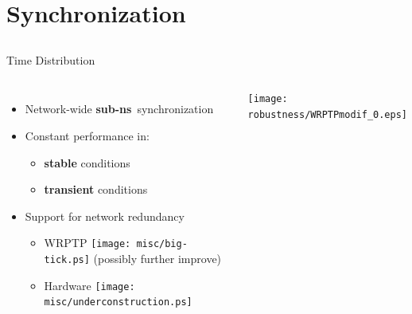 \documentclass[compress,red]{beamer}
\begin{document}
\section{Synchronization}
\subsection{}
\begin{frame}{Time Distribution}

  \begin{columns}[c]

  \begin{itemize}
    \item Network-wide {\bf sub-ns}~synchronization
    \vspace{0.3cm}
    \item Constant performance in:
	\begin{itemize}
	  \item {\bf stable} conditions
	  \item {\bf transient} conditions
	\end{itemize}
    \vspace{0.3cm}
    \item Support for network redundancy
    \begin{itemize}
      \item WRPTP \texttt{[image: misc/big-tick.ps]}  (possibly further improve)
      \item Hardware \texttt{[image: misc/underconstruction.ps]}
    \end{itemize}
  \end{itemize}


      \begin{center}
	\texttt{[image: robustness/WRPTPmodif\_0.eps]}
      \end{center}  
    

  \end{columns}

\end{frame}
\end{document}
